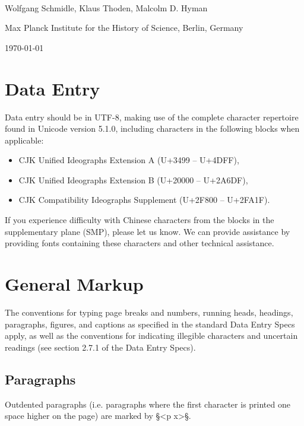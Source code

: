 \documentclass[fontsize=11pt, paper=a4, 
DIV15,
normalheadings,
parskip=half-, 
pointlessnumbers]{scrartcl}
\begin{document}
\begin{center}
{} \\[5mm]
\large Wolfgang Schmidle, Klaus Thoden, Malcolm D. Hyman

\normalsize Max Planck Institute for the History of Science, Berlin, Germany

\today
\end{center}


\section{Data Entry}

Data entry should be in UTF-8, making use of the complete character repertoire found in Unicode version 5.1.0, including characters in the following blocks when applicable: 

\begin{itemize}
\item CJK Unified Ideographs Extension A (U+3499 -- U+4DFF), 
\item CJK Unified Ideographs Extension B (U+20000 -- U+2A6DF), 
\item CJK Compatibility Ideographs Supplement (U+2F800 -- U+2FA1F). 
\end{itemize}

If you experience difficulty with Chinese characters from the blocks in the supplementary plane (SMP), please let us know. We can provide assistance by providing fonts containing these characters and other technical assistance.

\section{General Markup}

The conventions for typing page breaks and numbers, running heads, headings, paragraphs, figures, and captions as specified in the standard Data Entry Specs apply,
as well as the conventions for indicating illegible characters and uncertain readings (see section 2.7.1 of the Data Entry Specs). 

\subsection{Paragraphs}

Outdented paragraphs (i.e. paragraphs where the first character is printed one space higher on the page) are marked by §<p x>§.
\end{document}
